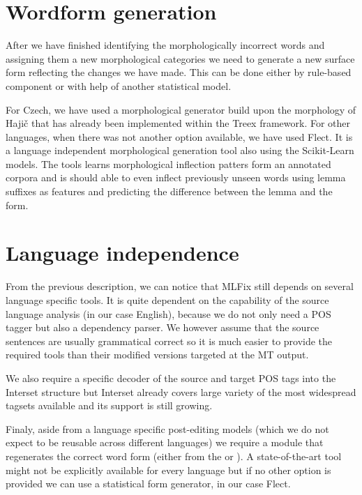 \section{Wordform generation}

After we have finished identifying the morphologically incorrect words and assigning
them a new morphological categories we need to generate a new surface form reflecting
the changes we have made.
This can be done either by rule-based component or with
help of another statistical model. 

For Czech, we have used a morphological generator build upon the morphology of Hajič\cite{HajicHAB2004}
that has already been implemented within the Treex framework. For other languages,
when there was not another option available,
we have used Flect\cite{DBLP:conf/acl/DusekJ13}.
It is a language independent morphological generation tool also using the Scikit-Learn
models. The tools learns morphological inflection patters form an annotated corpora and
is should able to even inflect previously unseen words using lemma suffixes as features
and predicting the difference between the lemma and the form.

\section{Language independence}

From the previous description, we can notice that MLFix still depends on several
language specific tools. It is quite dependent on the capability of the source
language analysis (in our case English), because we do not only need a POS tagger but also a dependency
parser. We however assume that the source sentences are usually grammatical correct
so it is much easier to provide the required tools than their modified versions
targeted at the MT output.

We also require a specific decoder of the source and target POS tags into the Interset
structure but Interset already covers large variety of the most widespread tagsets available
and its support is still growing.

Finaly, aside from a language specific post-editing models (which we do not expect
to be reusable across different languages) we require a module that regenerates
the correct word form (either from the  or ).
A state-of-the-art tool might not be explicitly available for every language but if no
other option is provided we can use a statistical form generator, in our case Flect.
